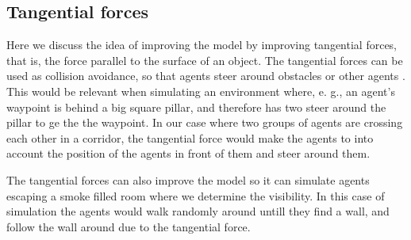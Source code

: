 \subsection{Tangential forces}
Here we discuss the idea of improving the model by improving tangential forces, that is, the force parallel to the surface of an object.
The tangential forces can be used as collision avoidance, so that agents steer around obstacles or other agents \cite{tang1}.
This would be relevant when simulating an environment where, e. g., an agent's waypoint is behind a big square pillar, and therefore
has two steer around the pillar to ge the the waypoint.
In our case where two groups of agents are crossing each other in a corridor, the tangential force would make the agents to into account
the position of the agents in front of them and steer around them.

The tangential forces can also improve the model so it can simulate agents escaping a smoke filled room where we determine the visibility.
In this case of simulation the agents would walk randomly around untill they find a wall, and follow the wall around due to the tangential force.
